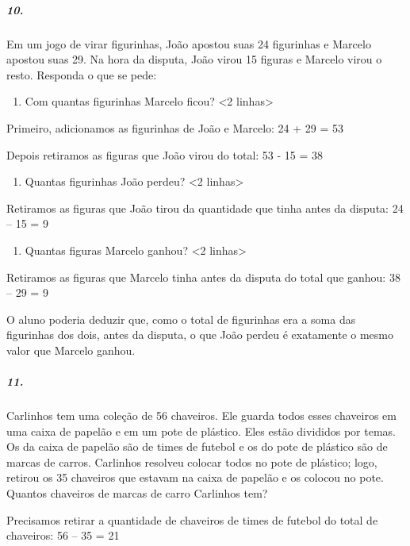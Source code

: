 \subparagraph{10.}\label{section-23}

Em um jogo de virar figurinhas, João apostou suas 24 figurinhas e Marcelo apostou suas 29. Na hora da disputa, João virou 15 figuras e Marcelo virou o resto. Responda o que
se pede:

\begin{enumerate}
\def\labelenumi{\Alph{enumi})}
\item
  Com quantas figurinhas Marcelo ficou? \textless{}2
  linhas\textgreater{}
\end{enumerate}

Primeiro, adicionamos as figurinhas de João e Marcelo: 24 + 29 = 53

Depois retiramos as figuras que João virou do total: 53 - 15 = 38

\begin{enumerate}
\def\labelenumi{\Alph{enumi})}
\item
  Quantas figurinhas João perdeu? \textless{}2 linhas\textgreater{}
\end{enumerate}

Retiramos as figuras que João tirou da quantidade que tinha antes da
disputa: 24 -- 15 = 9

\begin{enumerate}
\def\labelenumi{\Alph{enumi})}
\item
  Quantas figuras Marcelo ganhou? \textless{}2 linhas\textgreater{}
\end{enumerate}

Retiramos as figuras que Marcelo tinha antes da disputa do total que
ganhou: 38 -- 29 = 9

O aluno poderia deduzir que, como o total de figurinhas era a soma das
figurinhas dos dois, antes da disputa, o que João perdeu é exatamente o
mesmo valor que Marcelo ganhou.

\subparagraph{11.}\label{section-24}

Carlinhos tem uma coleção de 56 chaveiros. Ele guarda todos esses
chaveiros em uma caixa de papelão e em um pote de plástico. Eles estão
divididos por temas. Os da caixa de papelão são de times de futebol e os
do pote de plástico são de marcas de carros. Carlinhos resolveu colocar
todos no pote de plástico; logo, retirou os 35 chaveiros que estavam na
caixa de papelão e os colocou no pote. Quantos chaveiros de marcas de
carro Carlinhos tem?

Precisamos retirar a quantidade de chaveiros de times de futebol do
total de chaveiros: 56 -- 35 = 21


